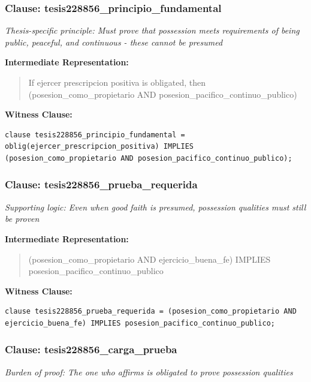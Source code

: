 \documentclass[11pt,a4paper]{article}
\begin{document}
\subsubsection{Clause: tesis228856\_principio\_fundamental}

\textit{Thesis-specific principle: Must prove that possession meets requirements of being public, peaceful, and continuous - these cannot be presumed}

\textbf{Intermediate Representation:}

\begin{quote}
If ejercer prescripcion positiva is obligated, then (posesion\_como\_propietario AND posesion\_pacifico\_continuo\_publico)
\end{quote}

\textbf{Witness Clause:}

\begin{lstlisting}[style=witnessstyle, language=Witness]
clause tesis228856_principio_fundamental = oblig(ejercer_prescripcion_positiva) IMPLIES (posesion_como_propietario AND posesion_pacifico_continuo_publico);
\end{lstlisting}

\subsubsection{Clause: tesis228856\_prueba\_requerida}

\textit{Supporting logic: Even when good faith is presumed, possession qualities must still be proven}

\textbf{Intermediate Representation:}

\begin{quote}
(posesion\_como\_propietario AND ejercicio\_buena\_fe) IMPLIES posesion\_pacifico\_continuo\_publico
\end{quote}

\textbf{Witness Clause:}

\begin{lstlisting}[style=witnessstyle, language=Witness]
clause tesis228856_prueba_requerida = (posesion_como_propietario AND ejercicio_buena_fe) IMPLIES posesion_pacifico_continuo_publico;
\end{lstlisting}

\subsubsection{Clause: tesis228856\_carga\_prueba}

\textit{Burden of proof: The one who affirms is obligated to prove possession qualities}
\end{document}
